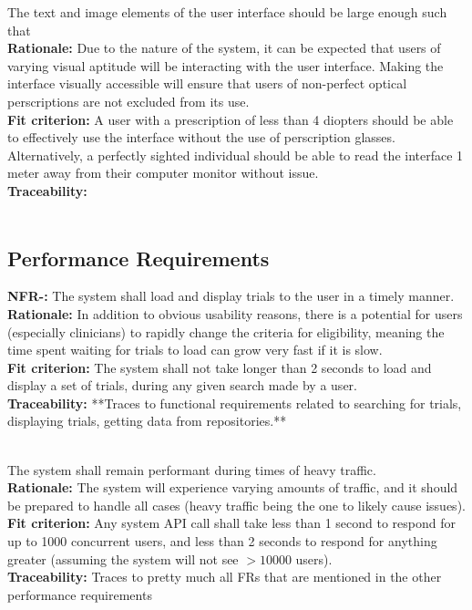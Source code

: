 \documentclass[12pt, titlepage]{article}
\newcounter{NFR_Counter}
\newcounter{FR_Counter}
\begin{document}
The text and image elements of the user interface should be large enough such that  \\
\textbf{Rationale:}
Due to the nature of the system, it can be expected that users of varying visual aptitude will be interacting with the user interface. Making the interface visually accessible will ensure that users of non-perfect optical perscriptions are not excluded from its use. \\
\textbf{Fit criterion:}
A user with a prescription of less than 4 diopters should be able to effectively use the interface without the use of perscription glasses. Alternatively, a perfectly sighted individual should be able to read the interface 1 meter away from their computer monitor without issue. \\
\textbf{Traceability:}
 \\~\\
\addtocounter{NFR_Counter}{1}


\subsection{Performance Requirements}

\textbf{NFR-\the\value{NFR_Counter}:}
The system shall load and display trials to the user in a timely manner.\\
\textbf{Rationale:}
In addition to obvious usability reasons, there is a potential for users (especially clinicians) to rapidly
change the criteria for eligibility, meaning the time spent waiting for trials to load can grow very fast if it is slow.\\
\textbf{Fit criterion:}
The system shall not take longer than 2 seconds to load and display a set of trials, during any given search made by a user.\\
\textbf{Traceability:}
**Traces to functional requirements related to searching for trials, displaying trials, getting data from repositories.** \\~\\
\addtocounter{NFR_Counter}{1}

The system shall remain performant during times of heavy traffic.\\
\textbf{Rationale:}
The system will experience varying amounts of traffic, and it should be prepared to handle all cases (heavy traffic being the 
one to likely cause issues).\\
\textbf{Fit criterion:}
Any system API call shall take less than 1 second to respond for up to 1000 concurrent users, and less than 2 seconds to respond for anything 
greater (assuming the system will not see $>10000$ users).\\
\textbf{Traceability:}
Traces to pretty much all FRs that are mentioned in the other performance requirements \\~\\
\addtocounter{NFR_Counter}{1}
\end{document}
